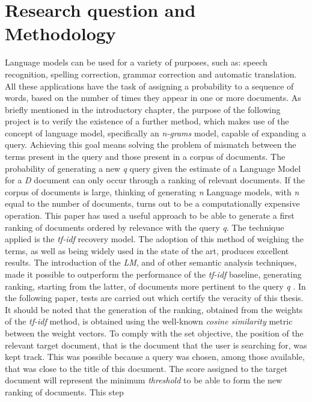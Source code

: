\section*{Research question and Methodology}

Language models can be used for a variety of purposes, such as: speech recognition, 
spelling correction, grammar correction and automatic translation. 
All these applications have the task of assigning a probability to a 
sequence of words, based on the number of times they appear in one or more 
documents. As briefly mentioned in the introductory chapter, the purpose 
of the following project is to verify the existence of a further method, which 
makes use of the concept of language model, specifically an \emph{n-grams} model, 
capable of expanding a query. Achieving this goal means solving the problem 
of mismatch between the terms present in the query and those present in a 
corpus of documents. The probability of generating a new \emph{q} query given the 
estimate of a Language Model for a \emph{D} document can only occur through a 
ranking of relevant documents. If the corpus of documents is large, thinking 
of generating \emph{n} Language models, with \emph{n} equal to the number of documents, 
turns out to be a computationally expensive operation. This paper has used 
a useful approach to be able to generate a first ranking of documents ordered 
by relevance with the query \emph{q}. The technique applied is the \emph{tf-idf} recovery 
model. The adoption of this method of weighing the terms, as well as being 
widely used in the state of the art, produces excellent results. The introduction 
of the \emph{LM}, and of other semantic analysis techniques, made it possible 
to outperform the performance of the \emph{tf-idf} baseline, generating ranking, 
starting from the latter, of documents more pertinent to the query \emph{q} \cite{09}. In 
the following paper, tests are carried out which certify the veracity of this 
thesis. It should be noted that the generation of the ranking, obtained from 
the weights of the \emph{tf-idf} method, is obtained using the well-known \emph{cosine 
similarity} metric between the weight vectors. To comply with the set objective, 
the position of the relevant target document, that is the document 
that the user is searching for, was kept track. This was possible because a 
query was chosen, among those available, that was close to the title of 
this document. The score assigned to the target document will represent the 
minimum \emph{threshold} to be able to form the new ranking of documents. This step 
